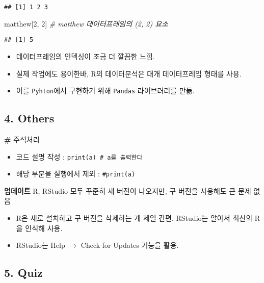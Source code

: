 \documentclass[
  12,
]{article}
\newenvironment{Shaded}{\begin{snugshade}}{\end{snugshade}}
\newcommand{\CommentTok}[1]{\textcolor[rgb]{0.56,0.35,0.01}{\textit{#1}}}
\newcommand{\DecValTok}[1]{\textcolor[rgb]{0.00,0.00,0.81}{#1}}
\newcommand{\NormalTok}[1]{#1}
\begin{document}
\begin{verbatim}
## [1] 1 2 3
\end{verbatim}

\begin{Shaded}
\begin{Highlighting}[]
\NormalTok{matthew[}\DecValTok{2}\NormalTok{, }\DecValTok{2}\NormalTok{] }\CommentTok{\# matthew 데이터프레임의 (2, 2) 요소}
\end{Highlighting}
\end{Shaded}

\begin{verbatim}
## [1] 5
\end{verbatim}

\begin{itemize}
\item
  데이터프레임의 인덱싱이 조금 더 깔끔한 느낌.
\item
  실제 작업에도 용이한바, R의 데이터분석은 대개 데이터프레임 형태를
  사용.
\item
  이를 \texttt{Pyhton}에서 구현하기 위해 \texttt{Pandas} 라이브러리를
  만듦.
\end{itemize}

\hypertarget{others}{%
\subsection{4. Others}\label{others}}

\textbf{\#} 주석처리

\begin{itemize}
\item
  코드 설명 작성 : \texttt{print(a)\ \#\ a를\ 출력한다}
\item
  해당 부분을 실행에서 제외 : \texttt{\#print(a)}
\end{itemize}

\textbf{업데이트} R, RStudio 모두 꾸준히 새 버전이 나오지만, 구 버전을
사용해도 큰 문제 없음

\begin{itemize}
\item
  R은 새로 설치하고 구 버전을 삭제하는 게 제일 간편. RStudio는 알아서
  최신의 R을 인식해 사용.
\item
  RStudio는 Help \(\to\) Check for Updates 기능을 활용.
\end{itemize}

\hypertarget{quiz}{%
\subsection{5. Quiz}\label{quiz}}
\end{document}
